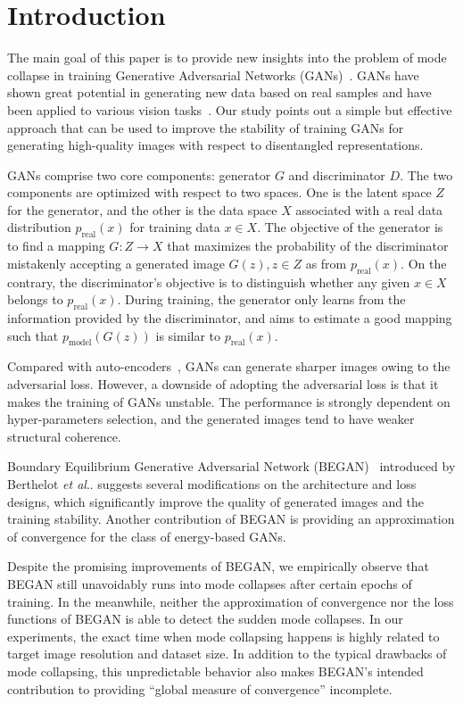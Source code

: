 \documentclass[runningheads]{llncs}
\makeatletter
\DeclareRobustCommand\onedot{\futurelet\@let@token\@onedot}
\def\@onedot{\ifx\@let@token.\else.\null\fi\xspace}
\def\etal{\emph{et al}\onedot}
\makeatother
\begin{document}
\section{Introduction}
    
    The main goal of this paper is to provide new insights into the problem of mode collapse in training Generative Adversarial Networks (GANs)~\cite{GAN}. GANs have shown great potential in generating new data based on real samples and have been applied to various vision tasks~\cite{BousmalisSDEK17,DaiFUL17,GwakCGCS17,LedigTHCCAATTWS17,LiLY017,ShrivastavaPTSW17,SoulySS17,TzengHSD17}. Our study points out a simple but effective approach that can be used to improve the stability of training GANs for generating high-quality images with respect to disentangled representations.  
    
    GANs comprise two core components: generator $G$ and discriminator $D$. The two components are optimized with respect to two spaces. One is the latent space $Z$ for the generator, and the other is the data space $X$ associated with a real data distribution $p_{\mathrm{real}}(x)$ for training data $x \in X$. The objective of the generator is to find a mapping $G: Z \rightarrow X$ that maximizes the probability of the discriminator mistakenly accepting a generated image $G(z), z \in Z$ as from $p_{\mathrm{real}}(x)$. On the contrary, the discriminator's objective is to distinguish whether any given $x \in X$ belongs to $p_{\mathrm{real}}(x)$. During training, the generator only learns from the information provided by the discriminator, and aims to estimate a good mapping such that $p_{\mathrm{model}}(G(z))$ is similar to $p_{\mathrm{real}}(x)$.
    
    Compared with auto-encoders~\cite{AutoEncoder}, GANs can generate sharper images owing to the adversarial loss. However, a downside of adopting the adversarial loss is that it makes the training of GANs unstable. The performance is strongly dependent on hyper-parameters selection, and the generated images tend to have weaker structural coherence.
   
    Boundary Equilibrium Generative Adversarial Network (BEGAN)~\cite{BEGAN} introduced by Berthelot \etal suggests several modifications on the architecture and loss designs, which significantly improve the quality of generated images and the training stability. Another contribution of BEGAN is providing an approximation of convergence for the class of energy-based GANs.
    
    Despite the promising improvements of BEGAN, we empirically observe that BEGAN still unavoidably runs into mode collapses after certain epochs of training. In the meanwhile, neither the approximation of convergence nor the loss functions of BEGAN is able to detect the sudden mode collapses. In our experiments, the exact time when mode collapsing happens is highly related to target image resolution and dataset size. In addition to the typical drawbacks of mode collapsing, this unpredictable behavior also makes BEGAN's intended contribution to providing ``global measure of convergence'' incomplete.
\end{document}
